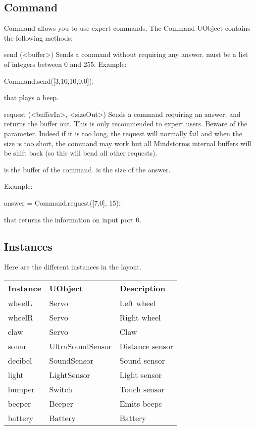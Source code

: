 \subsection{Command}
Command allows you to use expert commands. The Command UObject contains the
following methods:
\begin{urbiscriptapi}
\item[send](<buffer>) Sends a command without requiring any answer.
   must be a list of integers between 0 and 255.  Example:
\begin{urbiunchecked}
  Command.send([3,10,10,0,0]);
\end{urbiunchecked}

that plays a beep.

\item[request](<bufferIn>, <sizeOut>)%
  Sends a command requiring an answer, and returns the buffer out. This is
  only recommended to expert users. Beware of the 
  parameter. Indeed if it is too long, the request will normally fail and
  when the size is too short, the command may work but all Mindstorms
  internal buffers will be shift back (so this will bend all other
  requests).

   is the buffer of the command.  is the size of
  the answer.

  Example:
\begin{urbiunchecked}
  answer = Command.request([7,0], 15);
\end{urbiunchecked}

that returns the information on input port 0.
\end{urbiscriptapi}

\subsection{Instances}
Here are the different instances in the  layout.

\begin{tabular}{|l|l|l|}
  \hline
  Instance & UObject          & Description    \\
  \hline
  wheelL   & Servo            & Left wheel     \\
  wheelR   & Servo            & Right wheel    \\
  claw     & Servo            & Claw           \\
  sonar    & UltraSoundSensor & Distance sensor\\
  decibel  & SoundSensor      & Sound sensor   \\
  light    & LightSensor      & Light sensor   \\
  bumper   & Switch           & Touch sensor   \\
  beeper   & Beeper           & Emits beeps    \\
  battery  & Battery          & Battery        \\
  \hline
\end{tabular}


